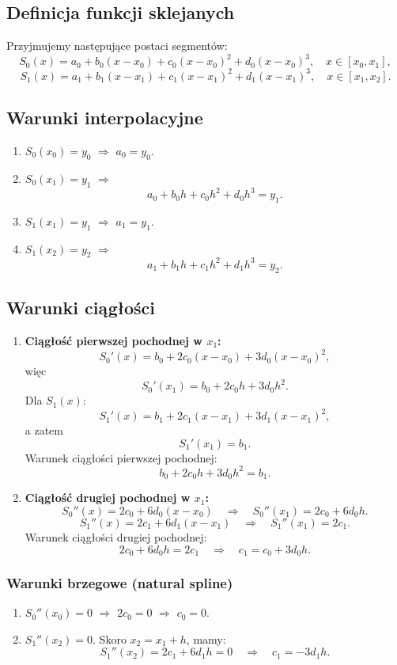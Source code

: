 \documentclass{article}
\begin{document}
\subsection{Definicja funkcji sklejanych}
Przyjmujemy następujące postaci segmentów:
\[
S_0(x)=a_0+b_0(x-x_0)+c_0(x-x_0)^2+d_0(x-x_0)^3,\quad x\in[x_0,x_1],
\]
\[
S_1(x)=a_1+b_1(x-x_1)+c_1(x-x_1)^2+d_1(x-x_1)^3,\quad x\in[x_1,x_2].
\]

\subsection{Warunki interpolacyjne}
\begin{enumerate}
    \item \(S_0(x_0)=y_0\) $\Longrightarrow$ \(a_0=y_0.\)
    \item \(S_0(x_1)=y_1\) $\Longrightarrow$
    \[
    a_0+b_0h+c_0h^2+d_0h^3=y_1.
    \]
    \item \(S_1(x_1)=y_1\) $\Longrightarrow$ \(a_1=y_1.\)
    \item \(S_1(x_2)=y_2\) $\Longrightarrow$
    \[
    a_1+b_1h+c_1h^2+d_1h^3=y_2.
    \]
\end{enumerate}

\subsection{Warunki ciągłości}
\begin{enumerate}
    \item \textbf{Ciągłość pierwszej pochodnej w \(x_1\):}
    \[
    S_0'(x)=b_0+2c_0(x-x_0)+3d_0(x-x_0)^2,
    \]
    więc
    \[
    S_0'(x_1)=b_0+2c_0h+3d_0h^2.
    \]
    Dla \(S_1(x)\):
    \[
    S_1'(x)=b_1+2c_1(x-x_1)+3d_1(x-x_1)^2,
    \]
    a zatem
    \[
    S_1'(x_1)=b_1.
    \]
    Warunek ciągłości pierwszej pochodnej:
    \[
    b_0+2c_0h+3d_0h^2=b_1.
    \]
    
    \item \textbf{Ciągłość drugiej pochodnej w \(x_1\):}
    \[
    S_0''(x)=2c_0+6d_0(x-x_0) \quad \Longrightarrow \quad S_0''(x_1)=2c_0+6d_0h.
    \]
    \[
    S_1''(x)=2c_1+6d_1(x-x_1) \quad \Longrightarrow \quad S_1''(x_1)=2c_1.
    \]
    Warunek ciągłości drugiej pochodnej:
    \[
    2c_0+6d_0h=2c_1 \quad \Longrightarrow \quad c_1=c_0+3d_0h.
    \]
\end{enumerate}

\subsubsection*{Warunki brzegowe (natural spline)}
\begin{enumerate}
    \item \(S_0''(x_0)=0\) $\Longrightarrow$ \(2c_0=0\) $\Longrightarrow$ \(c_0=0.\)
    \item \(S_1''(x_2)=0\). Skoro \(x_2=x_1+h\), mamy:
    \[
    S_1''(x_2)=2c_1+6d_1h=0 \quad \Longrightarrow \quad c_1=-3d_1h.
    \]
\end{enumerate}
\end{document}
